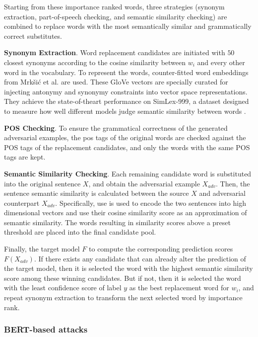 Starting from these importance ranked words, three strategies (synonym extraction, part-of-speech checking, and semantic similarity checking) are combined to replace words with the most semantically similar and grammatically correct substitutes.

\textbf{Synonym Extraction}.
Word replacement candidates are initiated with $50$ closest synonyms according to the cosine similarity between $w_i$ and every other word in the vocabulary.
To represent the words, counter-fitted word embeddings from Mrkšić et al. \cite{conf/naacl/MrksicSTGRSVWY16} are used.
These GloVe vectors are specially curated for injecting antonymy and synonymy constraints into vector space representations. They achieve the state-of-theart performance on SimLex-999, a dataset designed to measure how well different models judge semantic similarity between words \cite{hill2014simlex999}.


\textbf{POS Checking}.
To ensure the grammatical correctness of the generated adversarial examples, the \acrfull{pos} tags of the original words are checked against the POS tags of the replacement candidates, and only the words with the same POS tags are kept.

\textbf{Semantic Similarity Checking}.
Each remaining candidate word is substituted into the original sentence $X$, and obtain the adversarial example $X_{adv}$. Then, the sentence semantic similarity is calculated between the source $X$ and adversarial counterpart $X_{adv}$. Specifically, \acrfull{use} \cite{journals/corr/abs-1803-11175} is used to encode the two sentences into high dimensional vectors and use their cosine similarity score as an approximation of semantic similarity. The words resulting in similarity scores above a preset threshold are placed into the final candidate pool.

Finally, the target model $F$ to compute the corresponding prediction scores $F(X_{adv})$.
If there exists any candidate that can already alter the prediction of the target model, then it is selected the word with the highest semantic similarity score among these winning candidates. 
But if not, then it is selected the word with the least confidence score of label $y$ as the best replacement word for $w_i$, and repeat synonym extraction to transform the next selected word by importance rank.

\subsubsection{BERT-based attacks}\label{subsubsec:bert-based-attacks}

